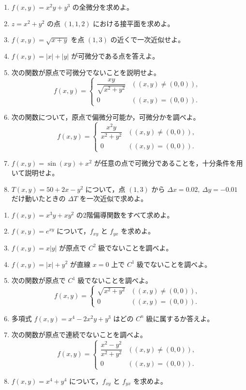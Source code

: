 \documentclass[dvipdfmx,a4paper,12pt]{jsarticle}
\newcommand{\subchap}[1]{\vspace{0.7em}{\large #1}\par\vspace{0.15em}}
\begin{document}
\begin{enumerate}[label=\arabic*.,start=17]
\item $f(x,y)=x^2y+y^3$ の全微分を求めよ。
\item $z=x^2+y^2$ の点 $(1,1,2)$ における接平面を求めよ。
\item $f(x,y)=\sqrt{x+y}$ を点 $(1,3)$ の近くで一次近似せよ。
\item $f(x,y)=|x|+|y|$ が可微分である点を答えよ。
\item 次の関数が原点で可微分でないことを説明せよ。
$$
f(x,y)=
\begin{cases}
\dfrac{xy}{\sqrt{x^2+y^2}} & ((x,y)\neq(0,0)),\\[0.7em]
0 & ((x,y)=(0,0)).
\end{cases}
$$
\item 次の関数について，原点で偏微分可能か，可微分かを調べよ。
$$
f(x,y)=
\begin{cases}
\dfrac{x^2y}{x^2+y^2} & ((x,y)\neq(0,0)),\\[0.7em]
0 & ((x,y)=(0,0)).
\end{cases}
$$
\item $f(x,y)=\sin(xy)+x^2$ が任意の点で可微分であることを，十分条件を用いて説明せよ。
\item $T(x,y)=50+2x-y^2$ について，点 $(1,3)$ から $\Delta x=0.02,\ \Delta y=-0.01$ だけ動いたときの $\Delta T$ を一次近似で求めよ。
\end{enumerate}

\subchap{D. $C^n$ 級・混合偏微分}

\begin{enumerate}[label=\arabic*.,start=25]
\item $f(x,y)=x^3y+xy^2$ の2階偏導関数をすべて求めよ。
\item $f(x,y)=e^{xy}$ について，$f_{xy}$ と $f_{yx}$ を求めよ。
\item $f(x,y)=x|y|$ が原点で $C^2$ 級でないことを調べよ。
\item $f(x,y)=|x|+y^2$ が直線 $x=0$ 上で $C^1$ 級でないことを調べよ。
\item 次の関数が原点で $C^1$ 級でないことを調べよ。
$$
f(x,y)=
\begin{cases}
\sqrt{x^2+y^2} & ((x,y)\neq(0,0)),\\
0 & ((x,y)=(0,0)).
\end{cases}
$$
\item 多項式 $f(x,y)=x^4-2x^2y+y^3$ はどの $C^n$ 級に属するか答えよ。
\item 次の関数が原点で連続でないことを調べよ。
$$
f(x,y)=
\begin{cases}
\dfrac{x^2-y^2}{x^2+y^2} & ((x,y)\neq(0,0)),\\[0.7em]
0 & ((x,y)=(0,0)).
\end{cases}
$$
\item $f(x,y)=x^4+y^4$ について，$f_{xy}$ と $f_{yx}$ を求めよ。
\end{enumerate}
\end{document}
